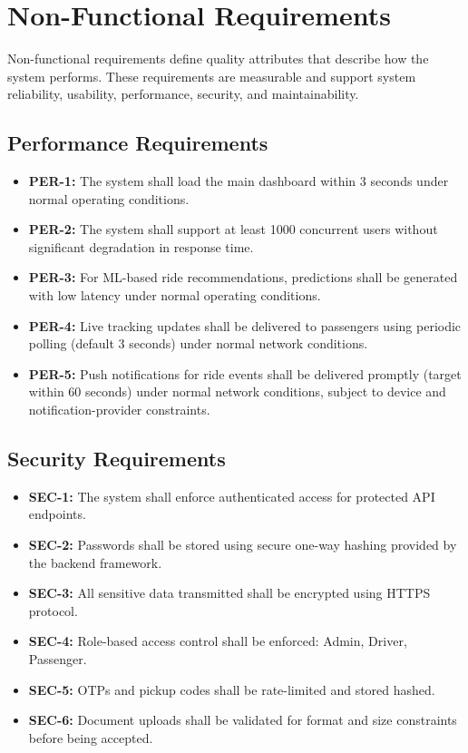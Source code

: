 \section{Non-Functional Requirements}

Non-functional requirements define quality attributes that describe how the system performs. These requirements are measurable and support system reliability, usability, performance, security, and maintainability.

\subsection{Performance Requirements}
\begin{itemize}
\item \textbf{PER-1:} The system shall load the main dashboard within 3 seconds under normal operating conditions.
\item \textbf{PER-2:} The system shall support at least 1000 concurrent users without significant degradation in response time.
\item \textbf{PER-3:} For ML-based ride recommendations, predictions shall be generated with low latency under normal operating conditions.
\item \textbf{PER-4:} Live tracking updates shall be delivered to passengers using periodic polling (default 3 seconds) under normal network conditions.
\item \textbf{PER-5:} Push notifications for ride events shall be delivered promptly (target within 60 seconds) under normal network conditions, subject to device and notification-provider constraints.
\end{itemize}

\subsection{Security Requirements}
\begin{itemize}
\item \textbf{SEC-1:} The system shall enforce authenticated access for protected API endpoints.
\item \textbf{SEC-2:} Passwords shall be stored using secure one-way hashing provided by the backend framework.
\item \textbf{SEC-3:} All sensitive data transmitted shall be encrypted using HTTPS protocol.
\item \textbf{SEC-4:} Role-based access control shall be enforced: Admin, Driver, Passenger.
\item \textbf{SEC-5:} OTPs and pickup codes shall be rate-limited and stored hashed.
\item \textbf{SEC-6:} Document uploads shall be validated for format and size constraints before being accepted.
\end{itemize}

